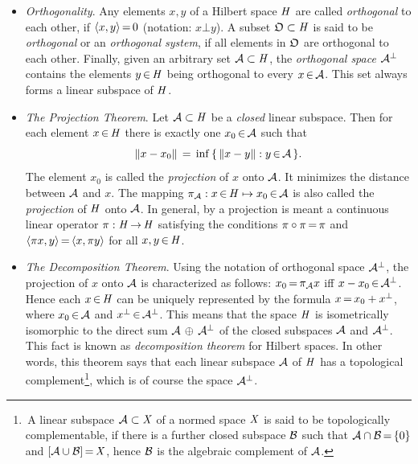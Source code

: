 \documentclass[11pt,twoside]{article}
\begin{document}
\begin{itemize}[leftmargin=5mm,itemsep=5pt]
\item[1.] \textit{Orthogonality}.
Any elements $x,y$ of a Hilbert space $\mathit{H}$ are called \textit{orthogonal}
to each other,
if $\langle x,y \rangle {\,=\,} 0$ (notation: $x \bot y$).
A subset $\mathfrak{O} \subset \mathit{H}$ is said to be \textit{orthogonal}
or an \textit{orthogonal system},
if all elements in $\mathfrak{O}$ are orthogonal to each other.
Finally,
given an arbitrary set $\mathcal{A} \subset \mathit{H}$,
the \textit{orthogonal space} $\mathcal{A}^{\bot}$ contains
the elements $y {\,\in\,} \mathit{H}$ being orthogonal to every $x {\,\in\,} \mathcal{A}$.
This set always forms a linear subspace of $\mathit{H}$.

\item[2.] \textit{The Projection Theorem}.
Let $\mathcal{A} \subset \mathit{H}$ be a \textit{closed} linear subspace.
Then for each element $x {\,\in\,} \mathit{H}$ there is exactly one $x_0 {\,\in\,} \mathcal{A}$
such that
\[
\left\lVert  x - x_0  \right\rVert \,=\, \inf \, \{ \, \left\lVert x-y \right\rVert: y {\,\in\,} \mathcal{A} \,\}.
\]
The element $x_0$ is called the \textit{projection} of $x$ onto $\mathcal{A}$.
It minimizes the distance between $\mathcal{A}$ and $x$.
The mapping
$\pi_{\mathcal{A}}:x {\,\in\,} \mathit{H} \mapsto x_0 {\,\in\,} \mathcal{A}$
is also called the \textit{projection} of $\mathit{H}$ onto $\mathcal{A}$.
In general,
by a projection is meant a continuous linear operator $\pi:\mathit{H} {\,\to\,} \mathit{H}$
satisfying the conditions $\pi \circ \pi {\,=\,} \pi$
and $\langle \pi x,y \rangle {\,=\,} \langle x,\pi y \rangle$ for all $x,y {\,\in\,} \mathit{H}$.

\item[3.] \textit{The Decomposition Theorem}.
Using the notation of orthogonal space $\mathcal{A}^{\bot}$,
the projection of $x$ onto $\mathcal{A}$ is characterized as follows:
$x_0 {\,=\,} \pi_{\mathcal{A}} x$ iff $x-x_0 {\,\in\,} \mathcal{A}^{\bot}$.
Hence each $x {\,\in\,} \mathit{H}$ can be uniquely represented by the formula
$x {\,=\,} x_0+x^{\bot}$,
where $x_0 {\,\in\,} \mathcal{A}$ and $x^{\bot} {\,\in\,} \mathcal{A}^{\bot}$.
This means
that the space $\mathit{H}$ is isometrically isomorphic to the direct sum
$\mathcal{A} \, \oplus \, \mathcal{A}^{\bot}$
of the closed subspaces $\mathcal{A}$ and $\mathcal{A}^{\bot}$.
This fact is known as \textit{decomposition theorem} for Hilbert spaces.
In other words,
this theorem says
that each linear subspace $\mathcal{A}$ of $\mathit{H}$
has a topological complement\footnote{
\,A linear subspace $\mathcal{A} \subset \mathit{X}$ of a normed space $\mathit{X}$
is said to be topologically complementable,
if there is a further closed subspace $\mathcal{B}$
such that $\mathcal{A} \cap \mathcal{B} {\,=\,} \{0\}$ and $[\mathcal{A} \cup \mathcal{B}] {\,=\,} \mathit{X}$,
hence $\mathcal{B}$ is the algebraic complement of $\mathcal{A}$.},
which is of course the space $\mathcal{A}^{\bot}$.


\end{itemize}
\end{document}
